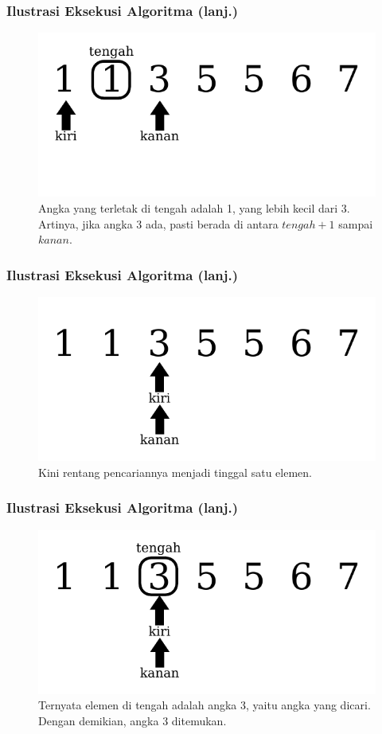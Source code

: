 \begin{frame}
\frametitle{Ilustrasi Eksekusi Algoritma (lanj.)}
  \begin{figure}
    \includegraphics{asset/BS-4.pdf}
    \caption{Angka yang terletak di tengah adalah 1, yang lebih kecil dari 3. Artinya, jika angka 3 ada, pasti berada di antara $tengah+1$ sampai $kanan$.}
  \end{figure}
\end{frame}


\begin{frame}
\frametitle{Ilustrasi Eksekusi Algoritma (lanj.)}
  \begin{figure}
    \vspace*{-0.32cm}
    \includegraphics{asset/BS-5.pdf}
    \caption{Kini rentang pencariannya menjadi tinggal satu elemen.}
  \end{figure}
\end{frame}


\begin{frame}
\frametitle{Ilustrasi Eksekusi Algoritma (lanj.)}
  \begin{figure}
    \includegraphics{asset/BS-6.pdf}
    \caption{Ternyata elemen di tengah adalah angka 3, yaitu angka yang dicari. Dengan demikian, angka 3 ditemukan.}
  \end{figure}
\end{frame}


